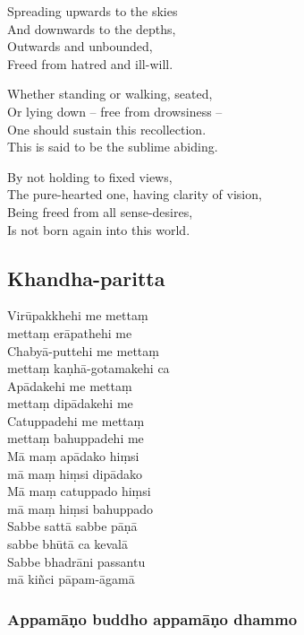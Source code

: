 Spreading upwards to the skies\\
And downwards to the depths,\\
Outwards and unbounded,\\
Freed from hatred and ill-will.

Whether standing or walking, seated, \\
Or lying down -- free from drowsiness --\\
One should sustain this recollection.\\
This is said to be the sublime abiding.

By not holding to fixed views,\\
The pure-hearted one, having clarity of vision,\\
Being freed from all sense-desires,\\
Is not born again into this world.


\subsection{Khandha-paritta}
\label{virupakkhehi}


Virūpakkhehi me mettaṃ\\\vin mettaṃ erāpathehi me\\
Chabyā-puttehi me mettaṃ\\\vin mettaṃ kaṇhā-gotamakehi ca\\
Apādakehi me mettaṃ\\\vin mettaṃ dipādakehi me\\
Catuppadehi me mettaṃ\\\vin mettaṃ bahuppadehi me\\
Mā maṃ apādako hiṃsi\\\vin mā maṃ hiṃsi dipādako\\
Mā maṃ catuppado hiṃsi\\\vin mā maṃ hiṃsi bahuppado\\
Sabbe sattā sabbe pāṇā\\\vin sabbe bhūtā ca kevalā\\
Sabbe bhadrāni passantu\\\vin mā kiñci pāpam-āgamā

\subsubsection{Appamāṇo buddho appamāṇo dhammo}

